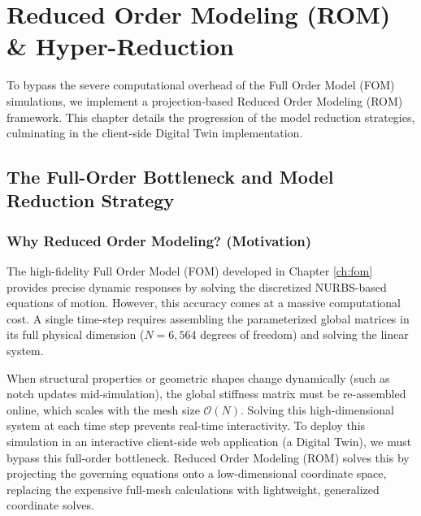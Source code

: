 \chapter{Reduced Order Modeling (ROM) \& Hyper-Reduction}
\label{ch:rom}

To bypass the severe computational overhead of the Full Order Model (FOM) simulations, we implement a projection-based Reduced Order Modeling (ROM) framework. This chapter details the progression of the model reduction strategies, culminating in the client-side Digital Twin implementation.

\section{The Full-Order Bottleneck and Model Reduction Strategy}
\subsection{Why Reduced Order Modeling? (Motivation)}
The high-fidelity Full Order Model (FOM) developed in Chapter \ref{ch:fom} provides precise dynamic responses by solving the discretized NURBS-based equations of motion. However, this accuracy comes at a massive computational cost. A single time-step requires assembling the parameterized global matrices in its full physical dimension ($N = 6,564$ degrees of freedom) and solving the linear system. 

When structural properties or geometric shapes change dynamically (such as notch updates mid-simulation), the global stiffness matrix must be re-assembled online, which scales with the mesh size $\mathcal{O}(N)$. Solving this high-dimensional system at each time step prevents real-time interactivity. To deploy this simulation in an interactive client-side web application (a Digital Twin), we must bypass this full-order bottleneck. Reduced Order Modeling (ROM) solves this by projecting the governing equations onto a low-dimensional coordinate space, replacing the expensive full-mesh calculations with lightweight, generalized coordinate solves.

